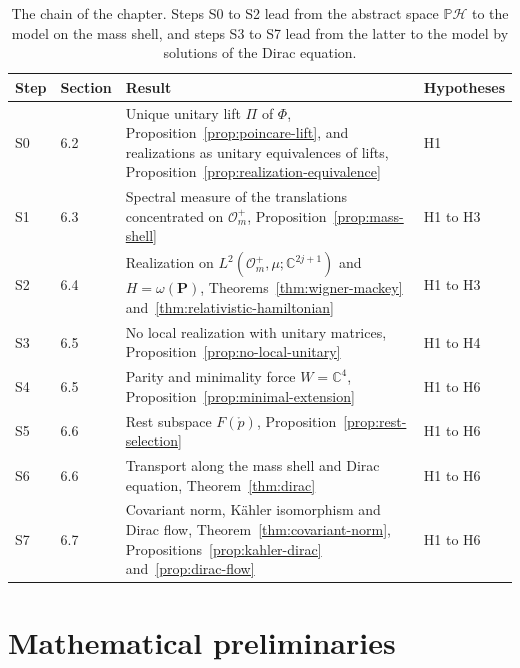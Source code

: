 \begin{table}[ht]
	\centering
	\small
	\renewcommand{\arraystretch}{1.25}
	\begin{tabular}{llp{7.6cm}l}
		\hline
		\textbf{Step} & \textbf{Section} & \textbf{Result} & \textbf{Hypotheses} \\
		\hline
		S0 & 6.2 & Unique unitary lift $\Pi$ of $\Phi$, Proposition~\ref{prop:poincare-lift}, and realizations as unitary equivalences of lifts, Proposition~\ref{prop:realization-equivalence} & H1 \\
		S1 & 6.3 & Spectral measure of the translations concentrated on $\mathcal{O}_m^+$, Proposition~\ref{prop:mass-shell} & H1 to H3 \\
		S2 & 6.4 & Realization on $L^2(\mathcal{O}_m^+,\mu;\mathbb{C}^{2j+1})$ and $H=\omega(\mathbf{P})$, Theorems~\ref{thm:wigner-mackey} and~\ref{thm:relativistic-hamiltonian} & H1 to H3 \\
		S3 & 6.5 & No local realization with unitary matrices, Proposition~\ref{prop:no-local-unitary} & H1 to H4 \\
		S4 & 6.5 & Parity and minimality force $W=\mathbb{C}^4$, Proposition~\ref{prop:minimal-extension} & H1 to H6 \\
		S5 & 6.6 & Rest subspace $F(\mathring{p})$, Proposition~\ref{prop:rest-selection} & H1 to H6 \\
		S6 & 6.6 & Transport along the mass shell and Dirac equation, Theorem~\ref{thm:dirac} & H1 to H6 \\
		S7 & 6.7 & Covariant norm, Kähler isomorphism and Dirac flow, Theorem~\ref{thm:covariant-norm}, Propositions~\ref{prop:kahler-dirac} and~\ref{prop:dirac-flow} & H1 to H6 \\
		\hline
	\end{tabular}
	\caption{The chain of the chapter. Steps S0 to S2 lead from the abstract space $\mathbb{P}\mathcal{H}$ to the model on the mass shell, and steps S3 to S7 lead from the latter to the model by solutions of the Dirac equation.}
	\label{tab:steps}
\end{table}


\section{Mathematical preliminaries}
\label{sec:preliminaries}

